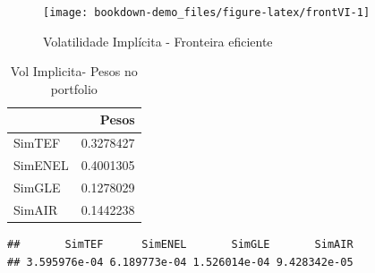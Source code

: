 \documentclass[
  12pt,
  a4paper,
  openany]{book}
\newenvironment{Shaded}{\begin{snugshade}}{\end{snugshade}}
\newcommand{\DataTypeTok}[1]{\textcolor[rgb]{0.13,0.29,0.53}{#1}}
\newcommand{\DecValTok}[1]{\textcolor[rgb]{0.00,0.00,0.81}{#1}}
\newcommand{\FloatTok}[1]{\textcolor[rgb]{0.00,0.00,0.81}{#1}}
\newcommand{\KeywordTok}[1]{\textcolor[rgb]{0.13,0.29,0.53}{\textbf{#1}}}
\newcommand{\NormalTok}[1]{#1}
\newcommand{\OperatorTok}[1]{\textcolor[rgb]{0.81,0.36,0.00}{\textbf{#1}}}
\newcommand{\StringTok}[1]{\textcolor[rgb]{0.31,0.60,0.02}{#1}}
\begin{document}
\normalsize

\begin{figure}

{\centering \texttt{[image: bookdown-demo\_files/figure-latex/frontVI-1]} 

}

\caption{Volatilidade Implícita - Fronteira eficiente}\label{fig:frontVI}
\end{figure}

\begin{table}[!h]

\caption{\label{tab:unnamed-chunk-56}Vol Implicita- Pesos no portfolio}
\centering
\begin{tabular}[t]{lr}
\toprule
  & Pesos\\
\midrule
SimTEF & 0.3278427\\
SimENEL & 0.4001305\\
SimGLE & 0.1278029\\
SimAIR & 0.1442238\\
\bottomrule
\end{tabular}
\end{table}

\scriptsize

\begin{Shaded}
\end{Shaded}

\begin{verbatim}
##       SimTEF      SimENEL       SimGLE       SimAIR 
## 3.595976e-04 6.189773e-04 1.526014e-04 9.428342e-05
\end{verbatim}

\begin{Shaded}
\end{Shaded}
\end{document}
